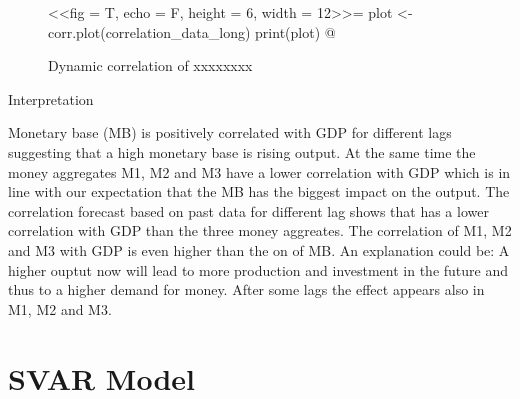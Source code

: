 \documentclass[11pt,a4paper]{report}
\begin{document}
\begin{figure}[H]
\caption{Dynamic correlation of xxxxxxxx}
\label{dyn_corr}
\centering
<<fig = T, echo = F, height = 6, width = 12>>=
plot <- corr.plot(correlation_data_long)
print(plot)
@
\end{figure}

Interpretation 

Monetary base (MB) is positively correlated with GDP for different lags suggesting that a high monetary base is rising output. At the same time the money aggregates M1, M2 and M3 have a lower correlation with GDP which is in line with our expectation that the MB has the biggest impact on the output. The correlation forecast based on past data for different lag shows that has a lower correlation with GDP than the three money aggreates. The correlation of M1, M2 and M3 with GDP is even higher than the on of MB. An explanation could be: A higher ouptut now will lead to more production and investment in the future and thus to a higher demand for money. After some lags the effect appears also in M1, M2 and M3.


\newpage
\section*{SVAR Model}
\end{document}
